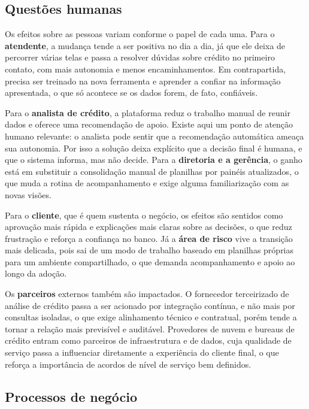 \documentclass[12pt,a4paper]{article}
\begin{document}
\subsection{Quest\~oes humanas}

Os efeitos sobre as pessoas variam conforme o papel de cada uma. Para o \textbf{atendente}, a mudan\c{c}a tende a ser positiva no dia a dia, j\'a que ele deixa de percorrer v\'arias telas e passa a resolver d\'uvidas sobre cr\'edito no primeiro contato, com mais autonomia e menos encaminhamentos. Em contrapartida, precisa ser treinado na nova ferramenta e aprender a confiar na informa\c{c}\~ao apresentada, o que s\'o acontece se os dados forem, de fato, confi\'aveis.

Para o \textbf{analista de cr\'edito}, a plataforma reduz o trabalho manual de reunir dados e oferece uma recomenda\c{c}\~ao de apoio. Existe aqui um ponto de aten\c{c}\~ao humano relevante: o analista pode sentir que a recomenda\c{c}\~ao autom\'atica amea\c{c}a sua autonomia. Por isso a solu\c{c}\~ao deixa expl\'icito que a decis\~ao final \'e humana, e que o sistema informa, mas n\~ao decide. Para a \textbf{diretoria e a ger\^encia}, o ganho est\'a em substituir a consolida\c{c}\~ao manual de planilhas por pain\'eis atualizados, o que muda a rotina de acompanhamento e exige alguma familiariza\c{c}\~ao com as novas vis\~oes.

Para o \textbf{cliente}, que \'e quem sustenta o neg\'ocio, os efeitos s\~ao sentidos como aprova\c{c}\~ao mais r\'apida e explica\c{c}\~oes mais claras sobre as decis\~oes, o que reduz frustra\c{c}\~ao e refor\c{c}a a confian\c{c}a no banco. J\'a a \textbf{\'area de risco} vive a transi\c{c}\~ao mais delicada, pois sai de um modo de trabalho baseado em planilhas pr\'oprias para um ambiente compartilhado, o que demanda acompanhamento e apoio ao longo da ado\c{c}\~ao.

Os \textbf{parceiros} externos tamb\'em s\~ao impactados. O fornecedor terceirizado de an\'alise de cr\'edito passa a ser acionado por integra\c{c}\~ao cont\'inua, e n\~ao mais por consultas isoladas, o que exige alinhamento t\'ecnico e contratual, por\'em tende a tornar a rela\c{c}\~ao mais previs\'ivel e audit\'avel. Provedores de nuvem e bureaus de cr\'edito entram como parceiros de infraestrutura e de dados, cuja qualidade de servi\c{c}o passa a influenciar diretamente a experi\^encia do cliente final, o que refor\c{c}a a import\^ancia de acordos de n\'ivel de servi\c{c}o bem definidos.

\subsection{Processos de neg\'ocio}
\end{document}
